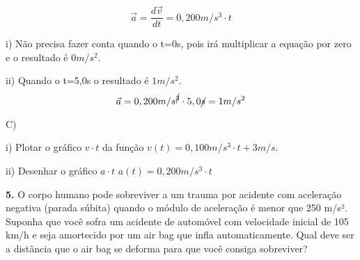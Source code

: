 \documentclass[a4paper, 12pt]{article}
\begin{document}
\begin{flushleft}
		\begin{equation*}
			\vec{a} = \dfrac{d\vec{v}}{dt} = 0,200m/s^3 \cdot t
		\end{equation*}
		
		i) Não precisa fazer conta quando o t=0s, pois irá multiplicar a equação por zero e o resultado é $0m/s^2$.
		
		ii) Quando o t=5,0s o resultado é $1m/s^2$.
		\begin{equation*}
			\vec{a} = 0,200m/s^{\cancel{3}} \cdot 5,0\cancel{s} = 1m/s^2
		\end{equation*}
		
		C)  
		
		i) Plotar o gráfico $v \cdot t$ da função $v(t)=0,100m/s^3 \cdot t+3m/s$.
		\begin{center}
		\end{center}
		
		ii) Desenhar o gráfico $a \cdot t$ $a(t) = 0,200m/s^3 \cdot t$
		\begin{center}
		\end{center}
		
		\vspace{2em}
		
		\textbf{5.} O corpo humano pode sobreviver a um trauma por acidente com aceleração negativa (parada súbita) quando o módulo de aceleração é menor que 250 m/s². Suponha que você sofra um acidente de automóvel com velocidade inicial de 105 km/h e seja amortecido por um air bag que infla automaticamente. Qual deve ser a distância que o air bag se deforma para que você consiga sobreviver?
		

\end{flushleft}
\end{document}

